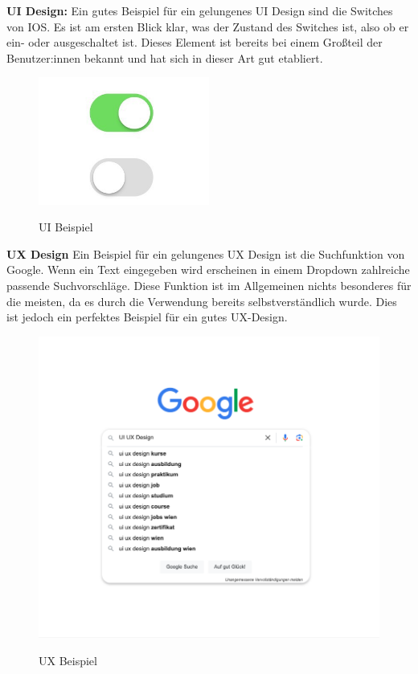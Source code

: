 \textbf{UI Design:}
\newline
Ein gutes Beispiel für ein gelungenes UI Design sind die Switches von IOS. Es ist am ersten Blick klar, was der Zustand des Switches ist, also ob er ein- oder ausgeschaltet ist. Dieses Element ist bereits bei einem Großteil der Benutzer:innen bekannt und hat sich in dieser Art gut etabliert.

\begin{figure}[h!]
    \centering
    \includegraphics[width=0.5\textwidth]{pics/ui-example.png}
    \caption{UI Beispiel}
    \cite{frontend_ui_ux}
    \label{fig:mesh1}
\end{figure}
\newpage
\textbf{UX Design}
\newline
Ein Beispiel für ein gelungenes UX Design ist die Suchfunktion von Google. Wenn ein Text eingegeben wird erscheinen in einem Dropdown zahlreiche passende Suchvorschläge. Diese Funktion ist im Allgemeinen nichts besonderes für die meisten, da es durch die Verwendung bereits selbstverständlich wurde. Dies ist jedoch ein perfektes Beispiel für ein gutes UX-Design.

\begin{figure}[h!]
    \centering
    \includegraphics[width=1\textwidth]{pics/ux-example.png}
    \caption{UX Beispiel}
    \cite{frontend_ui_ux}
    \label{fig:mesh1}
\end{figure}

\cite{frontend_ui_ux}